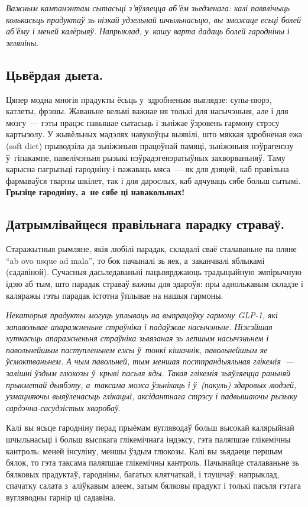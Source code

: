 \emph{Важным кампанэнтам сытасьці з'яўляецца аб'ём зьедзенага: калі павялічыць колькасьць прадуктаў зь нізкай удзельнай шчыльнасьцю, вы зможаце есьці болей аб'ёму і меней калёрыяў. Напрыклад, у~кашу варта дадаць болей гародніны і зеляніны.}

\subsection*{Цьвёрдая дыета.}
Цяпер модна многія прадукты ёсьць у~здробненым выглядзе: супы-пюрэ, катлеты, фрэшы. Жаваньне вельмі важнае ня толькі для насычэньня, але і для мозгу~--- гэты працэс павышае сытасьць і зьніжае ўзровень гармону стрэсу картызолу. У жывёльных мадэлях навукоўцы выявілі, што мяккая здробненая ежа (soft diet) прыводзіла да зьніжэньня працоўнай памяці, зьніжэньня нэўрагенэзу ў~гіпакампе, павелічэньня рызыкі нэўрадэгенэратыўных захворваньняў. Таму карысна пагрызьці гародніну і пажаваць мяса~--- як для дзяцей, каб правільна фармаваўся тварны шкілет, так і для дарослых, каб адчуваць сябе больш сытымі. \textbf{Грызіце гародніну, а~не сябе ці навакольных!}

\subsection*{Датрымлівайцеся правільнага парадку страваў.}
Старажытныя рымляне, якія любілі парадак, складалі сваё сталаваньне па пляне ``ab ovo usque ad mala'', то бок пачыналі зь яек, а~заканчвалі яблыкамі (садавіной). Сучасныя дасьледаваньні пацьвярджаюць традыцыйную эмпірычную ідэю аб тым, што парадак страваў важны для здароўя: пры аднолькавым складзе і каляражы гэты парадак істотна ўплывае на нашыя гармоны.

\emph{Некаторыя прадукты могуць уплываць на выпрацоўку гармону GLP-1, які запавольвае апаражненьне страўніка і падаўжае насычэньне. Ніжэйшая хуткасьць апаражненьня страўніка зьвязаная зь лепшым насычэньнем і павольнейшым паступленьнем ежы ў~тонкі кішачнік, павольнейшым яе ўсмоктваньнем. А чым павольней, тым меншая постпрандыяльная глікемія~--- залішні ўздым глюкозы ў~крыві пасьля яды. Такая глікемія зьяўляецца раньняй прыкметай дыябэту, а~таксама можа ўзьнікаць і ў~(пакуль) здаровых людзей, узмацняючы выяўленасьць глікацыі, аксідантнага стрэсу і падвышаючы рызыку сардэчна-сасудзістых хваробаў.}

Калі вы ясьце гародніну перад прыёмам вугляводаў больш высокай калярыйнай шчыльнасьці і больш высокага глікемічнага індэксу, гэта паляпшае глікемічны кантроль: меней інсуліну, меншы ўздым глюкозы. Калі вы зьядаеце першым бялок, то гэта таксама паляпшае глікемічны кантроль. Пачынайце сталаваньне зь бялковых прадуктаў, гародніны, багатых клятчаткай, і тлушчаў: напрыклад, спачатку салата з~аліўкавым алеем, затым бялковы прадукт і толькі пасьля гэтага вугляводны гарнір ці садавіна.

